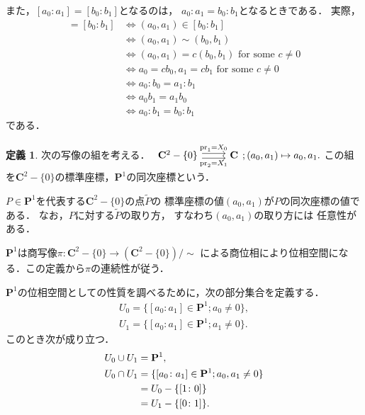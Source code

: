 \documentclass[11pt, a4paper, dvipdfmx, draft]{jsarticle}
\theoremstyle{definition}
\newtheorem{Definition}[Axiom]{定義}
\newcommand{\cc}{\mathbf{C}}
\newcommand{\pp}{\mathbf{P}}
\newcommand{\pr}{\mathop{\mathrm{pr}}\nolimits} %
\theoremstyle{mystyle}
\numberwithin{equation}{section} %
\begin{document}
また，$[a_0\colon a_1]=[b_0\colon b_1]$となるのは，
$a_0\colon a_1=b_0\colon b_1$となるときである．
実際，
\begin{align*}
    [a_0\colon a_1]=[b_0\colon b_1]
    &\Longleftrightarrow
    (a_0, a_1)\in[b_0\colon b_1]\\
    &\Longleftrightarrow
    (a_0, a_1)\sim(b_0, b_1)\\
    &\Longleftrightarrow
    (a_0, a_1)=c(b_0, b_1) \text{ for some }c\neq0\\
    &\Longleftrightarrow
    a_0=cb_0, a_1=cb_1 \text{ for some }c\neq0\\    
    &\Longleftrightarrow
    a_0\colon b_0 = a_1 \colon b_1\\
    &\Longleftrightarrow
    a_0 b_1 = a_1 b_0\\
    &\Longleftrightarrow
    a_0\colon b_1 = b_0 \colon b_1
\end{align*}
である．

\begin{Definition}\label{def:coord1}
    次の写像の組を考える．
    $\begin{tikzcd}
      {\cc^{2}-\{0\}}
        \arrow[r, shift left ,"\pr_1=X_0"]
        \arrow[r, shift right,"\pr_2=X_1"']
      & {\cc}
    \end{tikzcd}; (a_0,a_1)\mapsto a_0,a_1.$
    この組を$\cc^{2}-\{0\}$の標準座標，$\pp^1$の同次座標という．
\end{Definition}
$P\in\pp^1$を代表する$\cc^{2}-\{0\}$の点$\widetilde{P}$の
標準座標の値$(a_0,a_1)$が$P$の同次座標の値である．
なお，$P$に対する$\widetilde{P}$の取り方，
すなわち$(a_0,a_1)$の取り方には
任意性がある．

$\pp^{1}$は商写像$\pi \colon \cc^{2}-\{0\}
\longrightarrow\left(\cc^{2}-\{0\}\right)/{\sim}$
による商位相により位相空間になる．この定義から$\pi$の連続性が従う．

$\pp^1$の位相空間としての性質を調べるために，次の部分集合を定義する．
\begin{align*}
    U_0=\{[a_0\colon a_1]\in\pp^1; a_0\neq0\},\\
    U_1=\{[a_0\colon a_1]\in\pp^1; a_1\neq0\}.
\end{align*}
このとき次が成り立つ．
\begin{align}
    U_0\cup U_1 &= \pp^1, \label{eq:cov1}\\
    U_0\cap U_1 
    &= \{[a_0\colon a_1]\in\pp^1; a_0, a_1\neq0\} \label{eq:inter-p1}\\
    &= U_0 - \{[1\colon 0]\}  \notag\\
    &= U_1 - \{[0\colon 1]\}. \notag
\end{align}
\end{document}
